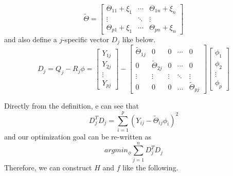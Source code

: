 \documentclass[11pt]{article}
\begin{document}
\begin{itemize}
$$\tilde{\Theta} = 
\begin{bmatrix}
\Theta_{11} + \xi_1 & \cdots & \Theta_{1n} + \xi_n\\
\vdots & \ddots & \vdots\\
\Theta_{p1}+\xi_1 & \cdots & \Theta_{pn} + \xi_n
\end{bmatrix}
$$
\noindent and also define a $j$-specific vector $D_j$ like below.
$$D_j = Q_j-R_j\phi = \begin{bmatrix} Y_{1j} \\ Y_{2j} \\ \vdots \\ Y_{pj} \end{bmatrix} - \begin{bmatrix}
\tilde{\Theta}_{1j} & 0 & 0 &\cdots & 0\\
0 & \tilde{\Theta}_{2j} & 0 & \cdots & 0\\
\vdots & \vdots & \vdots & \ddots & \vdots \\
0 & 0 & 0 & ... & \tilde{\Theta}_{pj}
\end{bmatrix}
\begin{bmatrix}
\phi_1\\
\phi_2\\
\vdots\\
\phi_p
\end{bmatrix}
$$
\end{itemize}
\noindent Directly from the definition, e can see that
$$D_j^T D_j = \sum_{i=1}^{p} (Y_{ij}-\tilde{\Theta}_{ij} \phi_i)^2$$
and our optimization goal can be re-written as
$$argmin_{\phi} \sum_{j=1}^{n} D_j^T D_j$$
\noindent Therefore, we can construct $H$ and $f$ like the following.
\end{document}
